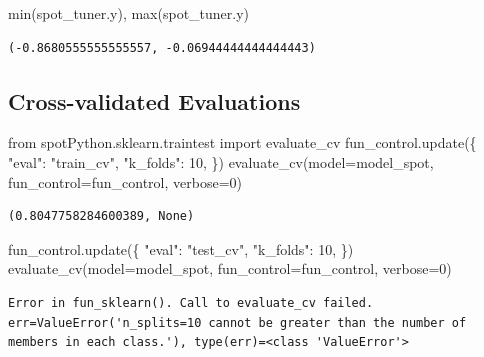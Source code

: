 \documentclass[
  letterpaper,
  DIV=11,
  numbers=noendperiod]{scrreprt}
\newenvironment{Shaded}{\begin{snugshade}}{\end{snugshade}}
\newcommand{\BuiltInTok}[1]{\textcolor[rgb]{0.00,0.23,0.31}{#1}}
\newcommand{\DecValTok}[1]{\textcolor[rgb]{0.68,0.00,0.00}{#1}}
\newcommand{\ImportTok}[1]{\textcolor[rgb]{0.00,0.46,0.62}{#1}}
\newcommand{\NormalTok}[1]{\textcolor[rgb]{0.00,0.23,0.31}{#1}}
\newcommand{\OperatorTok}[1]{\textcolor[rgb]{0.37,0.37,0.37}{#1}}
\newcommand{\StringTok}[1]{\textcolor[rgb]{0.13,0.47,0.30}{#1}}
\begin{document}
\begin{Shaded}
\begin{Highlighting}[]
\BuiltInTok{min}\NormalTok{(spot\_tuner.y), }\BuiltInTok{max}\NormalTok{(spot\_tuner.y)}
\end{Highlighting}
\end{Shaded}

\begin{verbatim}
(-0.8680555555555557, -0.06944444444444443)
\end{verbatim}

\hypertarget{cross-validated-evaluations-1}{%
\subsection{Cross-validated
Evaluations}\label{cross-validated-evaluations-1}}

\begin{Shaded}
\begin{Highlighting}[]
\ImportTok{from}\NormalTok{ spotPython.sklearn.traintest }\ImportTok{import}\NormalTok{ evaluate\_cv}
\NormalTok{fun\_control.update(\{}
     \StringTok{"eval"}\NormalTok{: }\StringTok{"train\_cv"}\NormalTok{,}
     \StringTok{"k\_folds"}\NormalTok{: }\DecValTok{10}\NormalTok{,}
\NormalTok{\})}
\NormalTok{evaluate\_cv(model}\OperatorTok{=}\NormalTok{model\_spot, fun\_control}\OperatorTok{=}\NormalTok{fun\_control, verbose}\OperatorTok{=}\DecValTok{0}\NormalTok{)}
\end{Highlighting}
\end{Shaded}

\begin{verbatim}
(0.8047758284600389, None)
\end{verbatim}

\begin{Shaded}
\begin{Highlighting}[]
\NormalTok{fun\_control.update(\{}
     \StringTok{"eval"}\NormalTok{: }\StringTok{"test\_cv"}\NormalTok{,}
     \StringTok{"k\_folds"}\NormalTok{: }\DecValTok{10}\NormalTok{,}
\NormalTok{\})}
\NormalTok{evaluate\_cv(model}\OperatorTok{=}\NormalTok{model\_spot, fun\_control}\OperatorTok{=}\NormalTok{fun\_control, verbose}\OperatorTok{=}\DecValTok{0}\NormalTok{)}
\end{Highlighting}
\end{Shaded}

\begin{verbatim}
Error in fun_sklearn(). Call to evaluate_cv failed. err=ValueError('n_splits=10 cannot be greater than the number of members in each class.'), type(err)=<class 'ValueError'>
\end{verbatim}
\end{document}
